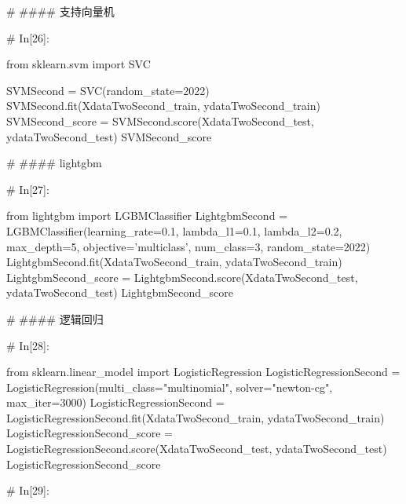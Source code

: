 \documentclass{MathorCupmodeling}
\begin{document}
\begin{python}
# #### 支持向量机

# In[26]:


from sklearn.svm import SVC

SVMSecond = SVC(random_state=2022)
SVMSecond.fit(XdataTwoSecond_train, ydataTwoSecond_train)
SVMSecond_score = SVMSecond.score(XdataTwoSecond_test, ydataTwoSecond_test)
SVMSecond_score


# #### lightgbm

# In[27]:


from lightgbm import LGBMClassifier
LightgbmSecond = LGBMClassifier(learning_rate=0.1,
                                lambda_l1=0.1,
                                lambda_l2=0.2,
                                max_depth=5,
                                objective='multiclass',
                                num_class=3,
                                random_state=2022)
LightgbmSecond.fit(XdataTwoSecond_train, ydataTwoSecond_train)
LightgbmSecond_score = LightgbmSecond.score(XdataTwoSecond_test, ydataTwoSecond_test)
LightgbmSecond_score


# #### 逻辑回归

# In[28]:


from sklearn.linear_model import LogisticRegression
LogisticRegressionSecond = LogisticRegression(multi_class="multinomial", solver="newton-cg", max_iter=3000)
LogisticRegressionSecond = LogisticRegressionSecond.fit(XdataTwoSecond_train, ydataTwoSecond_train)
LogisticRegressionSecond_score = LogisticRegressionSecond.score(XdataTwoSecond_test, ydataTwoSecond_test)
LogisticRegressionSecond_score


# In[29]:



\end{python}
\end{document}
